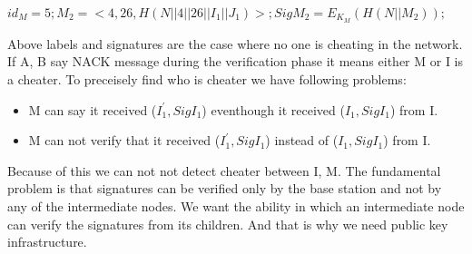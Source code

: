 	$id_{M} = 5; M_{2} = <4, 26, H(N||4||26||I_{1}||J_{1})>; Sig M_{2} = E_{K_{M}}(H(N||M_{2})); $

	Above labels and signatures are the case where no one is cheating in the network. If A, B say NACK message during the verification phase it means either M or I is a cheater. To preceisely find who is cheater we have following problems:

	\begin{itemize}
		\item M can say it received ($I_{1}^{'}, Sig I_{1}$) eventhough it received ($I_{1}, Sig I_{1}$) from I.
		\item M can not verify that it received ($I_{1}^{'}, Sig I_{1}$) instead of ($I_{1}, Sig I_{1}$) from I.
	\end{itemize}
	Because of this we can not not detect cheater between I, M. The fundamental problem is that signatures can be verified only by the base station and not by any of the intermediate nodes. We want the ability in which an intermediate node can verify the signatures from its children. And that is why we need public key infrastructure.

